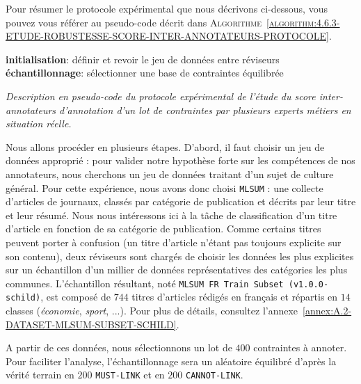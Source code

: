 			Pour résumer le protocole expérimental que nous décrivons ci-dessous, vous pouvez vous référer au pseudo-code décrit dans \textsc{Algorithme~\ref{algorithm:4.6.3-ETUDE-ROBUSTESSE-SCORE-INTER-ANNOTATEURS-PROTOCOLE}}.

			\begin{algorithm}
				\textbf{initialisation}: définir et revoir le jeu de données entre réviseurs \;
				\textbf{échantillonnage}: sélectionner une base de contraintes équilibrée \;
				\caption{\textit{
					Description en pseudo-code du protocole expérimental de l'étude du score inter-annotateurs d'annotation d'un lot de contraintes par plusieurs experts métiers en situation réelle.
				}}
				\label{algorithm:4.3.3-ETUDE-COUTS-TEMPS-ANNOTATION-PROTOCOLE}
			\end{algorithm}
			
			Nous allons procéder en plusieurs étapes.
			D'abord, il faut choisir un jeu de données approprié : pour valider notre hypothèse forte sur les compétences de nos annotateurs, nous cherchons un jeu de données traitant d'un sujet de culture général.
			Pour cette expérience, nous avons donc choisi \texttt{MLSUM} : une collecte d'articles de journaux, classés par catégorie de publication et décrits par leur titre et leur résumé.
			Nous nous intéressons ici à la tâche de classification d'un titre d'article en fonction de sa catégorie de publication.
			Comme certains titres peuvent porter à confusion (un titre d'article n'étant pas toujours explicite sur son contenu), deux réviseurs sont chargés de choisir les données les plus explicites sur un échantillon d'un millier de données représentatives des catégories les plus communes.
			L'échantillon résultant, noté \texttt{MLSUM FR Train Subset (v1.0.0-schild)}, est composé de $744$ titres d'articles rédigés en français et répartis en $14$ classes (\textit{économie}, \textit{sport}, ...).
			Pour plus de détails, consultez l'annexe~\ref{annex:A.2-DATASET-MLSUM-SUBSET-SCHILD}.
		
			A partir de ces données, nous sélectionnons un lot de $400$ contraintes à annoter.
			Pour faciliter l'analyse, l'échantillonnage sera un aléatoire équilibré d'après la vérité terrain en $200$ \texttt{MUST-LINK} et en $200$ \texttt{CANNOT-LINK}.
			
